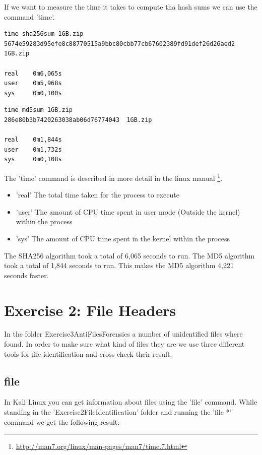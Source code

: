 \documentclass[a4paper,10pt,oneside]{article}
\begin{document}
If we want to measure the time it takes to compute tha hash sums we can use the command 'time'.

\begin{lstlisting}[caption=Time taken for SHA256]
time sha256sum 1GB.zip
5674e59283d95efe8c88770515a9bbc80cbb77cb67602389fd91def26d26aed2  1GB.zip

real    0m6,065s
user    0m5,968s
sys     0m0,100s
\end{lstlisting}

\begin{lstlisting}[caption=Time taken for MD5]
time md5sum 1GB.zip
286e80b3b7420263038ab06d76774043  1GB.zip

real    0m1,844s
user    0m1,732s
sys     0m0,108s
\end{lstlisting}

The 'time' command is described in more detail in the linux manual \footnote{\url{http://man7.org/linux/man-pages/man7/time.7.html}}.
\begin{itemize}
        \item 'real' The total time taken for the process to execute
        \item 'user' The amount of CPU time spent in user mode (Outside the kernel) within the process
        \item 'sys' The amount of CPU time spent in the kernel within the process
\end{itemize}

The SHA256 algorithm took a total of 6,065 seconds to run. The MD5 algorithm took a total of 1,844 seconds to run. This makes the MD5 algorithm 4,221 seconds faster.


\newpage
\section{Exercise 2: File Headers}
In the folder Exercise3\textunderscore Anti\textunderscore Files\textunderscore Forensics a number of unidentified files where found.
In order to make sure what kind of files they are we use three different tools for file identification and cross check their result.
\subsection{file}
In Kali Linux you can get information about files using the 'file' command. While standing in the 'Exercise2\textunderscore File\textunderscore Identification' folder and
running the 'file *' command we get the following result:
\end{document}
